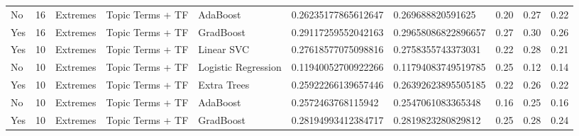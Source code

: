 \begin{table}[]
\begin{tabular}{@{}llllllllll@{}}
    No                  & 16              & Extremes              & Topic Terms + TF      & AdaBoost            & 0.26235177865612647     & 0.269688820591625      & 0.20               & 0.27            & 0.22              \\
    Yes                 & 16              & Extremes              & Topic Terms + TF      & GradBoost           & 0.29117259552042163     & 0.29658086822896657    & 0.27               & 0.30            & 0.26              \\
    Yes                 & 10              & Extremes              & Topic Terms + TF      & Linear SVC          & 0.27618577075098816     & 0.2758355743373031     & 0.22               & 0.28            & 0.21              \\
    No                  & 10              & Extremes              & Topic Terms + TF      & Logistic Regression & 0.11940052700922266     & 0.11794083749519785    & 0.25               & 0.12            & 0.14              \\
    Yes                 & 10              & Extremes              & Topic Terms + TF      & Extra Trees         & 0.25922266139657446     & 0.26392623895505185    & 0.22               & 0.26            & 0.22              \\
    No                  & 10              & Extremes              & Topic Terms + TF      & AdaBoost            & 0.2572463768115942      & 0.2547061083365348     & 0.16               & 0.25            & 0.16              \\
    Yes                 & 10              & Extremes              & Topic Terms + TF      & GradBoost           & 0.28194993412384717     & 0.2819823280829812     & 0.25               & 0.28            & 0.24             
    \end{tabular}
    \end{table}
    \clearpage